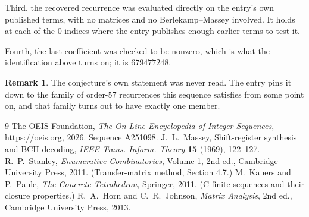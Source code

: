 \documentclass[11pt,a4paper]{article}
\theoremstyle{plain}
\theoremstyle{definition}
\newtheorem{remark}[theorem]{Remark}
\begin{document}
Third, the recovered recurrence was evaluated directly on the entry's own published terms, with
no matrices and no Berlekamp--Massey involved. It holds at each of the $0$ indices where
the entry publishes enough earlier terms to test it.

Fourth, the last coefficient was checked to be nonzero, which is what the identification above
turns on; it is $679477248$.

\begin{remark}
The conjecture's own statement was never read. The entry pins it down to the family of
order-$57$ recurrences this sequence satisfies from some point on, and that family turns
out to have exactly one member.
\end{remark}

\begin{thebibliography}{9}
 The OEIS Foundation, \emph{The On-Line Encyclopedia of Integer
Sequences}, \url{https://oeis.org}, 2026. Sequence A251098.
 J.~L.~Massey, Shift-register synthesis and BCH decoding, \emph{IEEE
Trans. Inform. Theory} \textbf{15} (1969), 122--127.
 R.~P.~Stanley, \emph{Enumerative Combinatorics}, Volume 1, 2nd ed.,
Cambridge University Press, 2011. (Transfer-matrix method, Section 4.7.)
 M.~Kauers and P.~Paule, \emph{The Concrete Tetrahedron}, Springer, 2011.
(C-finite sequences and their closure properties.)
 R.~A.~Horn and C.~R.~Johnson, \emph{Matrix Analysis}, 2nd ed., Cambridge
University Press, 2013.
\end{thebibliography}
\end{document}
